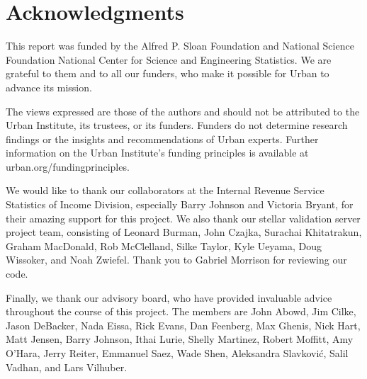 \fancyfoot{}



\part{Acknowledgments}

This report was funded by the Alfred P. Sloan Foundation and National Science Foundation National Center for Science and Engineering Statistics. We are grateful to them and to all our funders, who make it possible for Urban to advance its mission. 

The views expressed are those of the authors and should not be attributed to the Urban Institute, its trustees, or its funders. Funders do not determine research findings or the insights and recommendations of Urban experts. Further information on the Urban Institute’s funding principles is available at urban.org/fundingprinciples.

We would like to thank our collaborators at the Internal Revenue Service Statistics of Income Division, especially Barry Johnson and Victoria Bryant, for their amazing support for this project. We also thank our stellar validation server project team, consisting of Leonard Burman, John Czajka, Surachai Khitatrakun, Graham MacDonald, Rob McClelland, Silke Taylor, Kyle Ueyama, Doug Wissoker, and Noah Zwiefel. Thank you to Gabriel Morrison for reviewing our code.

Finally, we thank our advisory board, who have provided invaluable advice throughout the course of this project. The members are John Abowd, Jim Cilke, Jason DeBacker, Nada Eissa, Rick Evans, Dan Feenberg, Max Ghenis, Nick Hart, Matt Jensen, Barry Johnson, Ithai Lurie,  Shelly Martinez, Robert Moffitt, Amy O'Hara, Jerry Reiter, Emmanuel Saez, Wade Shen, Aleksandra Slavkovi\'c, Salil Vadhan, and Lars Vilhuber.